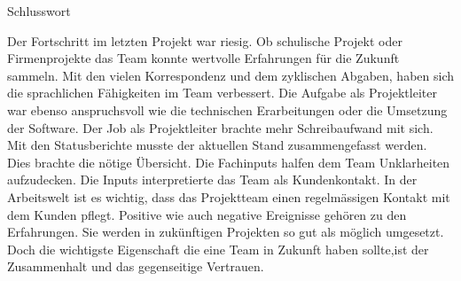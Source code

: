 Schlusswort 

Der Fortschritt im letzten Projekt war riesig. Ob schulische Projekt oder Firmenprojekte das Team konnte wertvolle Erfahrungen für die Zukunft sammeln. Mit den vielen Korrespondenz und dem zyklischen Abgaben, haben sich die sprachlichen Fähigkeiten im Team verbessert. Die Aufgabe als Projektleiter war ebenso anspruchsvoll wie die technischen Erarbeitungen oder die Umsetzung der Software. Der Job als Projektleiter brachte mehr Schreibaufwand mit sich. Mit den Statusberichte musste der aktuellen Stand zusammengefasst werden. Dies brachte die nötige Übersicht. Die Fachinputs halfen dem Team Unklarheiten aufzudecken. Die Inputs interpretierte das Team als Kundenkontakt. In der Arbeitswelt ist es wichtig, dass das Projektteam einen regelmässigen Kontakt mit dem Kunden pflegt.
Positive wie auch negative Ereignisse gehören zu den Erfahrungen. Sie werden in zukünftigen Projekten so gut als möglich umgesetzt. Doch die wichtigste Eigenschaft die eine Team in Zukunft haben sollte,ist der Zusammenhalt und das gegenseitige Vertrauen.

 